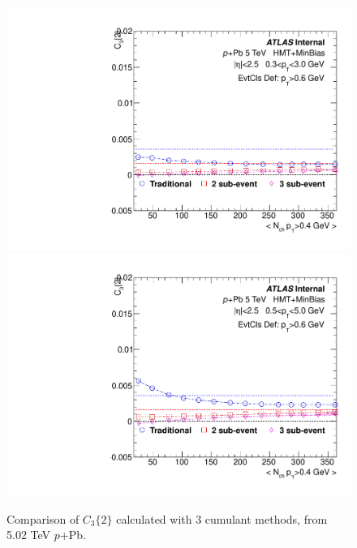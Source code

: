 \begin{figure}[p]
\includegraphics[width=0.4\linewidth]{figs/sec_result/pPb5/phy_2PC_Har1_Pt0_Cls3.pdf}
\includegraphics[width=0.4\linewidth]{figs/sec_result/pPb5/phy_2PC_Har1_Pt1_Cls3.pdf}
\caption{Comparison of $C_{3}\{2\}$ calculated with 3 cumulant methods, from 5.02 TeV $p$+Pb.}
\label{fig:result_pPb5_C32}
\end{figure}
\clearpage

